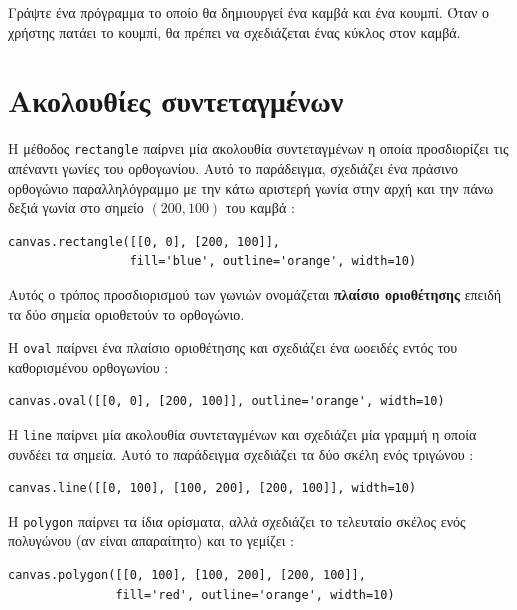 \documentclass[10pt]{book}
\begin{document}
\begin{exercise}
\label{circle}

Γράψτε ένα πρόγραμμα το οποίο θα δημιουργεί ένα καμβά και ένα κουμπί.  Όταν ο χρήστης 
πατάει το κουμπί, θα πρέπει να σχεδιάζεται ένας κύκλος στον καμβά.
\end{exercise}



\section{Ακολουθίες συντεταγμένων}

Η μέθοδος  {\tt rectangle}  παίρνει μία ακολουθία συντεταγμένων η οποία προσδιορίζει 
τις απέναντι γωνίες του ορθογωνίου.  Αυτό το παράδειγμα, σχεδιάζει ένα πράσινο ορθογώνιο 
παραλληλόγραμμο	με την κάτω αριστερή γωνία στην αρχή και την πάνω δεξιά γωνία στο σημείο 
$(200,100)$ του καμβά :

\begin{verbatim}
canvas.rectangle([[0, 0], [200, 100]],
                 fill='blue', outline='orange', width=10)
\end{verbatim}
%
 Αυτός ο τρόπος προσδιορισμού των γωνιών ονομάζεται {\bf πλαίσιο οριοθέτησης} επειδή 
τα δύο σημεία οριοθετούν το ορθογώνιο.

Η  {\tt oval}  παίρνει ένα πλαίσιο οριοθέτησης και σχεδιάζει ένα ωοειδές 
εντός του καθορισμένου ορθογωνίου :

\begin{verbatim}
canvas.oval([[0, 0], [200, 100]], outline='orange', width=10)
\end{verbatim}
%
 Η  {\tt line}  παίρνει μία ακολουθία συντεταγμένων και σχεδιάζει μία γραμμή 
η οποία συνδέει τα σημεία.  Αυτό το παράδειγμα σχεδιάζει τα δύο σκέλη ενός τριγώνου :

\begin{verbatim}
canvas.line([[0, 100], [100, 200], [200, 100]], width=10)
\end{verbatim}
%
 Η  {\tt polygon}  παίρνει τα ίδια ορίσματα, αλλά σχεδιάζει το τελευταίο σκέλος 
ενός πολυγώνου (αν είναι απαραίτητο) και το γεμίζει :

\begin{verbatim}
canvas.polygon([[0, 100], [100, 200], [200, 100]],
               fill='red', outline='orange', width=10)
\end{verbatim}
%
\end{document}
